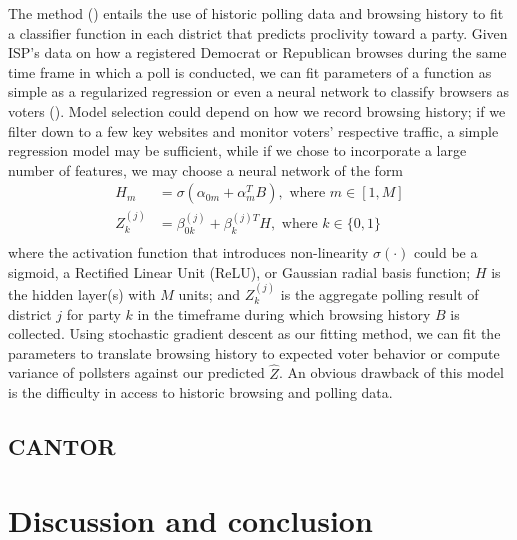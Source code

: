 \documentclass[12pt]{article}
\begin{document}
The method () entails the use of historic polling data and browsing history to fit a classifier function in each district that predicts proclivity toward a party. Given ISP's data on how a registered Democrat or Republican browses during the same time frame in which a poll is conducted, we can fit parameters of a function as simple as a regularized regression or even a neural network to classify browsers as voters (). Model selection could depend on how we record browsing history; if we filter down to a few key websites and monitor voters' respective traffic, a simple regression model may be sufficient, while if we chose to incorporate a large number of features, we may choose a neural network of the form
\begin{align*}
H_m &= \sigma(\alpha_{0m} + \alpha_m^TB), \text{\ where \ } m \in [1,M]\\
Z_{k}^{(j)} &= \beta_{0k}^{(j)} + \beta_k^{(j)T}H, \text{\ where \ } k \in \{0, 1\}\\
\end{align*}
where the activation function that introduces non-linearity $\sigma(\cdot)$ could be a sigmoid, a Rectified Linear Unit (ReLU), or Gaussian radial basis function; $H$ is the hidden layer(s) with $M$ units; and $Z_k^{(j)}$ is the aggregate polling result of district $j$ for party $k$ in the timeframe during which browsing history $B$ is collected. Using stochastic gradient descent as our fitting method, we can fit the parameters to translate browsing history to expected voter behavior or compute variance of pollsters against our predicted $\hat{Z}$. An obvious drawback of this model is the difficulty in access to historic browsing and polling data.

\subsection{CANTOR}

\section{Discussion and conclusion}
\label{sec:conc}



\end{document}
